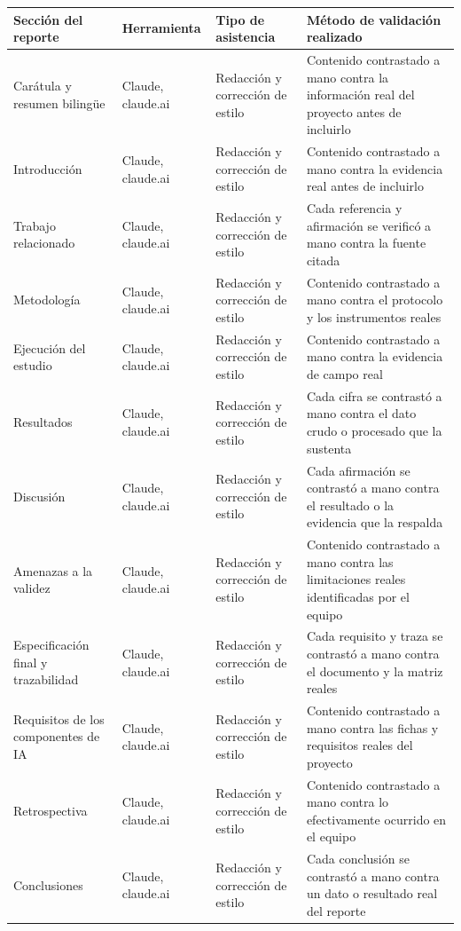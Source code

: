 \begin{longtable}{|L{2.6cm}|L{3.0cm}|L{3.6cm}|L{5.8cm}|}
\hline
{}\textbf{Sección del reporte} & \textbf{Herramienta} & \textbf{Tipo de asistencia} & \textbf{Método de validación realizado} \\
\hline
\endhead
Carátula y resumen bilingüe & Claude, claude.ai & Redacción y corrección de estilo & Contenido contrastado a mano contra la información real del proyecto antes de incluirlo \\ \hline
Introducción & Claude, claude.ai & Redacción y corrección de estilo & Contenido contrastado a mano contra la evidencia real antes de incluirlo \\ \hline
Trabajo relacionado & Claude, claude.ai & Redacción y corrección de estilo & Cada referencia y afirmación se verificó a mano contra la fuente citada \\ \hline
Metodología & Claude, claude.ai & Redacción y corrección de estilo & Contenido contrastado a mano contra el protocolo y los instrumentos reales \\ \hline
Ejecución del estudio & Claude, claude.ai & Redacción y corrección de estilo & Contenido contrastado a mano contra la evidencia de campo real \\ \hline
Resultados & Claude, claude.ai & Redacción y corrección de estilo & Cada cifra se contrastó a mano contra el dato crudo o procesado que la sustenta \\ \hline
Discusión & Claude, claude.ai & Redacción y corrección de estilo & Cada afirmación se contrastó a mano contra el resultado o la evidencia que la respalda \\ \hline
Amenazas a la validez & Claude, claude.ai & Redacción y corrección de estilo & Contenido contrastado a mano contra las limitaciones reales identificadas por el equipo \\ \hline
Especificación final y trazabilidad & Claude, claude.ai & Redacción y corrección de estilo & Cada requisito y traza se contrastó a mano contra el documento y la matriz reales \\ \hline
Requisitos de los componentes de IA & Claude, claude.ai & Redacción y corrección de estilo & Contenido contrastado a mano contra las fichas y requisitos reales del proyecto \\ \hline
Retrospectiva & Claude, claude.ai & Redacción y corrección de estilo & Contenido contrastado a mano contra lo efectivamente ocurrido en el equipo \\ \hline
Conclusiones & Claude, claude.ai & Redacción y corrección de estilo & Cada conclusión se contrastó a mano contra un dato o resultado real del reporte \\ \hline

\end{longtable}
